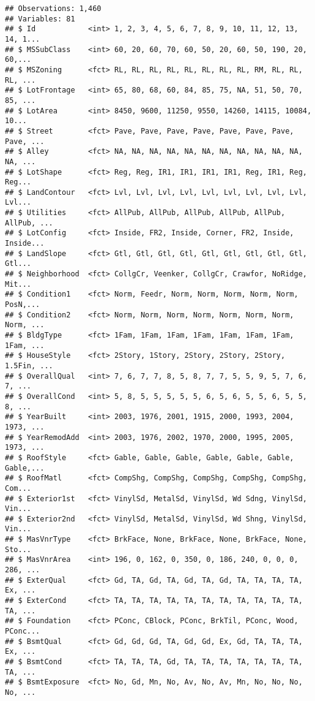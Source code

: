 \documentclass[]{article}
\begin{document}
\begin{verbatim}
## Observations: 1,460
## Variables: 81
## $ Id            <int> 1, 2, 3, 4, 5, 6, 7, 8, 9, 10, 11, 12, 13, 14, 1...
## $ MSSubClass    <int> 60, 20, 60, 70, 60, 50, 20, 60, 50, 190, 20, 60,...
## $ MSZoning      <fct> RL, RL, RL, RL, RL, RL, RL, RL, RM, RL, RL, RL, ...
## $ LotFrontage   <int> 65, 80, 68, 60, 84, 85, 75, NA, 51, 50, 70, 85, ...
## $ LotArea       <int> 8450, 9600, 11250, 9550, 14260, 14115, 10084, 10...
## $ Street        <fct> Pave, Pave, Pave, Pave, Pave, Pave, Pave, Pave, ...
## $ Alley         <fct> NA, NA, NA, NA, NA, NA, NA, NA, NA, NA, NA, NA, ...
## $ LotShape      <fct> Reg, Reg, IR1, IR1, IR1, IR1, Reg, IR1, Reg, Reg...
## $ LandContour   <fct> Lvl, Lvl, Lvl, Lvl, Lvl, Lvl, Lvl, Lvl, Lvl, Lvl...
## $ Utilities     <fct> AllPub, AllPub, AllPub, AllPub, AllPub, AllPub, ...
## $ LotConfig     <fct> Inside, FR2, Inside, Corner, FR2, Inside, Inside...
## $ LandSlope     <fct> Gtl, Gtl, Gtl, Gtl, Gtl, Gtl, Gtl, Gtl, Gtl, Gtl...
## $ Neighborhood  <fct> CollgCr, Veenker, CollgCr, Crawfor, NoRidge, Mit...
## $ Condition1    <fct> Norm, Feedr, Norm, Norm, Norm, Norm, Norm, PosN,...
## $ Condition2    <fct> Norm, Norm, Norm, Norm, Norm, Norm, Norm, Norm, ...
## $ BldgType      <fct> 1Fam, 1Fam, 1Fam, 1Fam, 1Fam, 1Fam, 1Fam, 1Fam, ...
## $ HouseStyle    <fct> 2Story, 1Story, 2Story, 2Story, 2Story, 1.5Fin, ...
## $ OverallQual   <int> 7, 6, 7, 7, 8, 5, 8, 7, 7, 5, 5, 9, 5, 7, 6, 7, ...
## $ OverallCond   <int> 5, 8, 5, 5, 5, 5, 5, 6, 5, 6, 5, 5, 6, 5, 5, 8, ...
## $ YearBuilt     <int> 2003, 1976, 2001, 1915, 2000, 1993, 2004, 1973, ...
## $ YearRemodAdd  <int> 2003, 1976, 2002, 1970, 2000, 1995, 2005, 1973, ...
## $ RoofStyle     <fct> Gable, Gable, Gable, Gable, Gable, Gable, Gable,...
## $ RoofMatl      <fct> CompShg, CompShg, CompShg, CompShg, CompShg, Com...
## $ Exterior1st   <fct> VinylSd, MetalSd, VinylSd, Wd Sdng, VinylSd, Vin...
## $ Exterior2nd   <fct> VinylSd, MetalSd, VinylSd, Wd Shng, VinylSd, Vin...
## $ MasVnrType    <fct> BrkFace, None, BrkFace, None, BrkFace, None, Sto...
## $ MasVnrArea    <int> 196, 0, 162, 0, 350, 0, 186, 240, 0, 0, 0, 286, ...
## $ ExterQual     <fct> Gd, TA, Gd, TA, Gd, TA, Gd, TA, TA, TA, TA, Ex, ...
## $ ExterCond     <fct> TA, TA, TA, TA, TA, TA, TA, TA, TA, TA, TA, TA, ...
## $ Foundation    <fct> PConc, CBlock, PConc, BrkTil, PConc, Wood, PConc...
## $ BsmtQual      <fct> Gd, Gd, Gd, TA, Gd, Gd, Ex, Gd, TA, TA, TA, Ex, ...
## $ BsmtCond      <fct> TA, TA, TA, Gd, TA, TA, TA, TA, TA, TA, TA, TA, ...
## $ BsmtExposure  <fct> No, Gd, Mn, No, Av, No, Av, Mn, No, No, No, No, ...

\end{verbatim}
\end{document}

